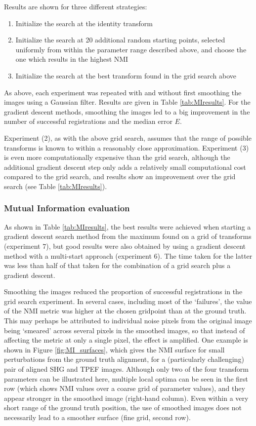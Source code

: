 \documentclass{report}
\begin{document}
Results are shown for three different strategies: 
\begin{enumerate}
    \item Initialize the search at the identity transform
    \item Initialize the search at 20 additional random starting points, selected uniformly from within the parameter range described above, and choose the one which results in the highest NMI
    \item Initialize the search at the best transform found in the grid search above
\end{enumerate}
As above, each experiment was repeated with and without first smoothing the images using a Gaussian filter. Results are given in Table \ref{tab:MIresults}. For the gradient descent methods, smoothing the images led to a big improvement in the number of successful registrations and the median error $E$.

Experiment (2), as with the above grid search, assumes that the range of possible transforms is known to within a reasonably close approximation. Experiment (3) is even more computationally expensive than the grid search, although the additional gradient descent step only adds a relatively small computational cost compared to the grid search, and results show an improvement over the grid search (see Table \ref{tab:MIresults}).

\subsubsection{Mutual Information evaluation}
As shown in Table \ref{tab:MIresults}, the best results were achieved when starting a gradient descent search method from the maximum found on a grid of transforms (experiment 7), but good results were also obtained by using a gradient descent method with a multi-start approach (experiment 6). The time taken for the latter was less than half of that taken for the combination of a grid search plus a gradient descent.

Smoothing the images reduced the proportion of successful registrations in the grid search experiment. In several cases, including most of the `failures', the value of the NMI metric was higher at the chosen gridpoint than at the ground truth. This may perhaps be attributed to individual noise pixels from the original image being `smeared' across several pixels in the smoothed images, so that instead of affecting the metric at only a single pixel, the effect is amplified. One example is shown in Figure \ref{fig:MI_surfaces}, which gives the NMI surface for small perturbations from the ground truth alignment, for a (particularly challenging) pair of aligned SHG and TPEF images. Although only two of the four transform parameters can be illustrated here, multiple local optima can be seen in the first row (which shows NMI values over a coarse grid of parameter values), and they appear stronger in the smoothed image (right-hand column). Even within a very short range of the ground truth position, the use of smoothed images does not necessarily lead to a smoother surface (fine grid, second row).
\end{document}
